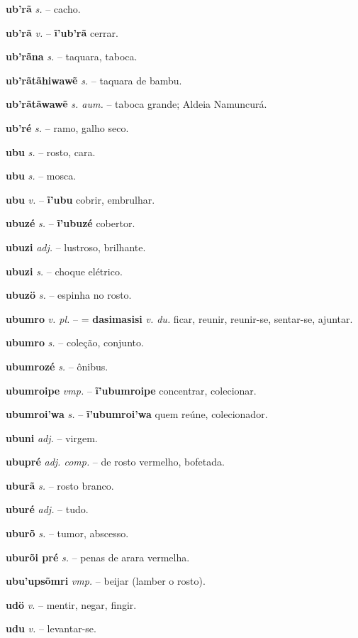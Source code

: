 \textbf{ub'rã} \textit{s.} -- cacho.

\textbf{ub'rã} \textit{v.} -- \textbf{ĩ'ub'rã} cerrar.

\textbf{ub'rãna} \textit{s.} -- taquara, taboca.

\textbf{ub'rãtãhiwawẽ} \textit{s.} -- taquara de bambu.

\textbf{ub'rãtãwawẽ} \textit{s. aum.} -- taboca grande; Aldeia Namuncurá.

\textbf{ub'ré} \textit{s.} -- ramo, galho seco.

\textbf{ubu} \textit{s.} -- rosto, cara.

\textbf{ubu} \textit{s.} -- mosca.

\textbf{ubu} \textit{v.} -- \textbf{ĩ'ubu} cobrir, embrulhar.

\textbf{ubuzé} \textit{s.} -- \textbf{ĩ'ubuzé} cobertor.

\textbf{ubuzi} \textit{adj.} -- lustroso, brilhante.

\textbf{ubuzi} \textit{s.} -- choque elétrico.

\textbf{ubuzö} \textit{s.} -- espinha no rosto.

\textbf{ubumro} \textit{v. pl.} -- = \textbf{dasimasisi} \textit{v. du.} ficar, reunir, reunir-se, sentar-se, ajuntar.

\textbf{ubumro} \textit{s.} -- coleção, conjunto.

\textbf{ubumrozé} \textit{s.} -- ônibus.

\textbf{ubumroipe} \textit{vmp.} -- \textbf{ĩ'ubumroipe} concentrar, colecionar.

\textbf{ubumroi'wa} \textit{s.} -- \textbf{ĩ'ubumroi'wa} quem reúne, colecionador.

\textbf{ubuni} \textit{adj.} -- virgem.

\textbf{ubupré} \textit{adj. comp.} -- de rosto vermelho, bofetada.

\textbf{uburã} \textit{s.} -- rosto branco.

\textbf{uburé} \textit{adj.} -- tudo.

\textbf{uburõ} \textit{s.} -- tumor, abscesso.

\textbf{uburõi pré} \textit{s.} -- penas de arara vermelha.

\textbf{ubu'upsõmri} \textit{vmp.} -- beijar (lamber o rosto).

\textbf{udö} \textit{v.} -- mentir, negar, fingir.

\textbf{udu} \textit{v.} -- levantar-se.

